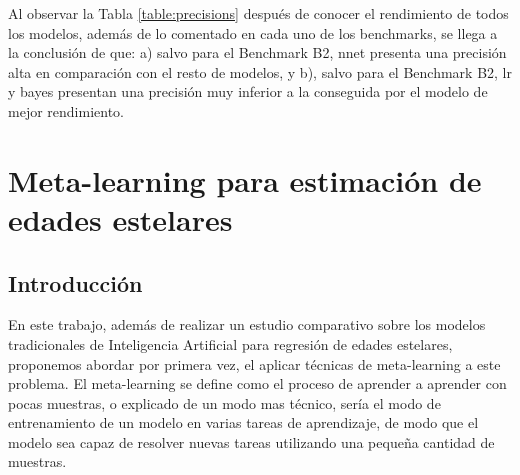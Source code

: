 Al observar la Tabla \ref{table:precisions} después de conocer el rendimiento de todos los modelos, además de lo comentado en cada uno de los benchmarks, se llega a la conclusión de que: a) salvo para el Benchmark B2, nnet presenta una precisión alta en comparación con el resto de modelos, y b), salvo para el Benchmark B2, lr y bayes presentan una precisión muy inferior a la conseguida por el modelo de mejor rendimiento.

\begin{table}[H]
\centering
{}%
\caption{Precisión de todos los métodos en los diferentes benchmarks. La precisión se mide como el porcentaje de estimaciones de edad que caen dentro del margen de confianza asociado a cada estrella.}\label{table:precisions}
\end{table}


\chapter{Meta-learning para estimación de edades estelares}
 
\section{Introducción}

En este trabajo, además de realizar un estudio comparativo sobre los modelos tradicionales de Inteligencia Artificial para regresión de edades estelares, proponemos abordar por primera vez, el aplicar técnicas de meta-learning a este problema. El meta-learning se define como el proceso de aprender a aprender con pocas muestras, o explicado de un modo mas técnico, sería el modo de entrenamiento de un modelo en varias tareas de aprendizaje, de modo que el modelo sea capaz de resolver nuevas tareas utilizando una pequeña cantidad de muestras. 

